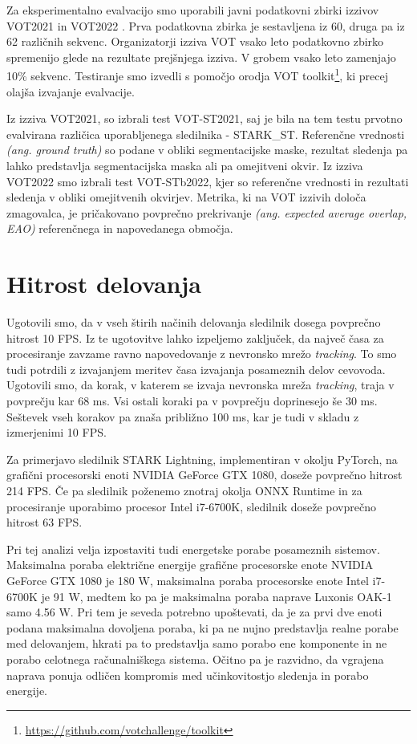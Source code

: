 \documentclass[a4paper,12pt,openright]{book}
\begin{document}
Za eksperimentalno evalvacijo smo uporabili javni podatkovni zbirki izzivov VOT2021 \cite{vot2021} in VOT2022 \cite{vot2022}. Prva podatkovna zbirka je sestavljena iz 60, druga pa iz 62 različnih sekvenc. Organizatorji izziva VOT vsako leto podatkovno zbirko spremenijo glede na rezultate prejšnjega izziva. V grobem vsako leto zamenjajo 10\% sekvenc. Testiranje smo izvedli s pomočjo orodja VOT toolkit\footnote{\url{https://github.com/votchallenge/toolkit}}, ki precej olajša izvajanje evalvacije.

Iz izziva VOT2021, so izbrali test VOT-ST2021, saj je bila na tem testu prvotno evalvirana različica uporabljenega sledilnika - STARK\_ST. Referenčne vrednosti \emph{(ang. ground truth)} so podane v obliki segmentacijske maske, rezultat sledenja pa lahko predstavlja segmentacijska maska ali pa omejitveni okvir. Iz izziva VOT2022 smo izbrali test VOT-STb2022, kjer so referenčne vrednosti in rezultati sledenja v obliki omejitvenih okvirjev. Metrika, ki na VOT izzivih določa zmagovalca, je pričakovano povprečno prekrivanje \emph{(ang. expected average overlap, EAO)} referenčnega in napovedanega območja.


\section{Hitrost delovanja}
Ugotovili smo, da v vseh štirih načinih delovanja sledilnik dosega povprečno hitrost 10 FPS. Iz te ugotovitve lahko izpeljemo zaključek, da največ časa za procesiranje zavzame ravno napovedovanje z nevronsko mrežo \emph{tracking}. To smo tudi potrdili z izvajanjem meritev časa izvajanja posameznih delov cevovoda. Ugotovili smo, da korak, v katerem se izvaja nevronska mreža \emph{tracking}, traja v povprečju kar 68 ms. Vsi ostali koraki pa v povprečju doprinesejo še 30 ms. Seštevek vseh korakov pa znaša približno 100 ms, kar je tudi v skladu z izmerjenimi 10 FPS.

Za primerjavo sledilnik STARK Lightning, implementiran v okolju Py\-Torch, na grafični procesorski enoti NVIDIA GeForce GTX 1080, doseže povprečno hitrost 214 FPS. Če pa sledilnik poženemo znotraj okolja ONNX Runtime in za procesiranje uporabimo procesor Intel i7-6700K, sledilnik doseže povprečno hitrost 63 FPS.

Pri tej analizi velja izpostaviti tudi energetske porabe posameznih sistemov. Maksimalna poraba električne energije grafične procesorske enote NVIDIA GeForce GTX 1080 je 180 W, maksimalna poraba procesorske enote Intel i7-6700K je 91 W, medtem ko pa je maksimalna poraba naprave Luxonis OAK-1 samo 4.56 W. Pri tem je seveda potrebno upoštevati, da je za prvi dve enoti podana maksimalna dovoljena poraba, ki pa ne nujno predstavlja realne porabe med delovanjem, hkrati pa to predstavlja samo porabo ene komponente in ne porabo celotnega računalniškega sistema. Očitno pa je razvidno, da vgrajena naprava ponuja odličen kompromis med učinkovitostjo sledenja in porabo energije.
\end{document}
